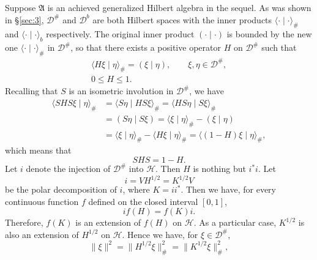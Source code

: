 \documentclass[12pt,b5paper,twoside]{article}
\theoremstyle{takesaki}
\numberwithin{equation}{section}
\begin{document}
Suppose $\mathfrak A$ is an achieved generalized Hilbert algebra in the
sequel.  As was shown in \S\ref{sec:3}, $\mathcal D^\#$ and
$\mathcal D^b$ are both Hilbert spaces with the inner products
$\langle\mathord\cdot\mid\mathord\cdot\rangle_\#$ and
$\langle\mathord\cdot\mid\mathord\cdot\rangle_b$ respectively.  The original inner
product $(\mathord\cdot\mid\mathord\cdot)$ is bounded by the new one
$\langle\mathord\cdot\mid\mathord\cdot\rangle_\#$ in $\mathcal D^\#$, so that there
exists a positive operator $H$ on $\mathcal D^\#$ such that
\begin{equation}
 \begin{gathered}
  \langle H\xi\mid\eta\rangle_\#=(\xi\mid\eta),
  \qquad \xi,\eta\in\mathcal D^\#,\\
  0\leq H\leq1.
 \end{gathered}
 \tag{7.1}\label{eq:7.1}
\end{equation}
Recalling that $S$ is an isometric involution in $\mathcal D^\#$, we
have
\begin{align*}
 \langle SHS\xi\mid\eta\rangle_\#
   &=\langle S\eta\mid HS\xi\rangle_\#
     =\langle HS\eta\mid S\xi\rangle_\#\\
   &=(S\eta\mid S\xi)=\langle\xi\mid\eta\rangle_\#-(\xi\mid\eta)\\
   &=\langle\xi\mid\eta\rangle_\#-\langle H\xi\mid\eta\rangle_\#
    =\langle(1-H)\xi\mid\eta\rangle_\#,
\end{align*}
which means that
\begin{equation}
 SHS=1-H.
 \tag{7.2}\label{eq:7.2}
\end{equation}
Let $i$ denote the injection of $\mathcal D^\#$ into $\mathcal H$.
Then $H$ is nothing but $i^*i$.  Let
\begin{equation}
 i=VH^{1/2}=K^{1/2}V
 \tag{7.3}\label{eq:7.3}
\end{equation}
be the polar decomposition of $i$, where $K=ii^*$.  Then we have, for
every continuous function $f$ defined on the closed interval $[0,1]$,
\begin{equation}
 if(H)=f(K)i.
 \tag{7.4}\label{eq:7.4}
\end{equation}
Therefore, $f(K)$ is an extension of $f(H)$ on $\mathcal H$.  As a
particular case, $K^{1/2}$ is also an extension of $H^{1/2}$ on
$\mathcal H$.  Hence we have, for $\xi\in\mathcal D^\#$,
\begin{equation}
 \|\xi\|^2=\|H^{1/2}\xi\|_\#^2
 =\|K^{1/2}\xi\|_\#^2,
 \tag{7.5}\label{eq:7.5}
\end{equation}
\end{document}

